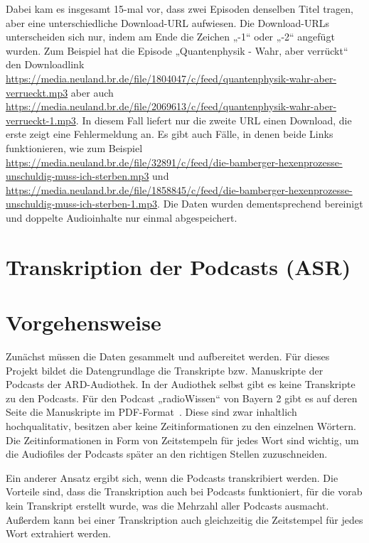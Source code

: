 Dabei kam es insgesamt 15-mal vor, dass zwei Episoden denselben Titel tragen, aber eine unterschiedliche Download-URL aufwiesen.
Die Download-URLs unterscheiden sich nur, indem am Ende die Zeichen „-1“ oder „-2“ angefügt wurden.
Zum Beispiel hat die Episode „Quantenphysik - Wahr, aber verrückt“ den Downloadlink \url{https://media.neuland.br.de/file/1804047/c/feed/quantenphysik-wahr-aber-verrueckt.mp3} aber auch \url{https://media.neuland.br.de/file/2069613/c/feed/quantenphysik-wahr-aber-verrueckt-1.mp3}.
In diesem Fall liefert nur die zweite URL einen Download, die erste zeigt eine Fehlermeldung an.
Es gibt auch Fälle, in denen beide Links funktionieren, wie zum Beispiel \url{https://media.neuland.br.de/file/32891/c/feed/die-bamberger-hexenprozesse-unschuldig-muss-ich-sterben.mp3} und \url{https://media.neuland.br.de/file/1858845/c/feed/die-bamberger-hexenprozesse-unschuldig-muss-ich-sterben-1.mp3}.
Die Daten wurden dementsprechend bereinigt und doppelte Audioinhalte nur einmal abgespeichert.

\section{Transkription der Podcasts (ASR)}

\section{Vorgehensweise}

Zunächst müssen die Daten gesammelt und aufbereitet werden.
Für dieses Projekt bildet die Datengrundlage die Transkripte bzw. Manuskripte der Podcasts der ARD-Audiothek.
In der Audiothek selbst gibt es keine Transkripte zu den Podcasts.
Für den Podcast „radioWissen“ von Bayern 2 gibt es auf deren Seite die Manuskripte im PDF-Format~\cite{rundfunk2024}.
Diese sind zwar inhaltlich hochqualitativ,  besitzen aber keine Zeitinformationen zu den einzelnen Wörtern.
Die Zeitinformationen in Form von Zeitstempeln für jedes Wort sind wichtig, um die Audiofiles der Podcasts später an den richtigen Stellen zuzuschneiden.

Ein anderer Ansatz ergibt sich, wenn die Podcasts transkribiert werden.
Die Vorteile sind, dass die Transkription auch bei Podcasts funktioniert, für die vorab kein Transkript erstellt wurde, was die Mehrzahl aller Podcasts ausmacht.
Außerdem kann bei einer Transkription auch gleichzeitig die Zeitstempel für jedes Wort extrahiert werden.

